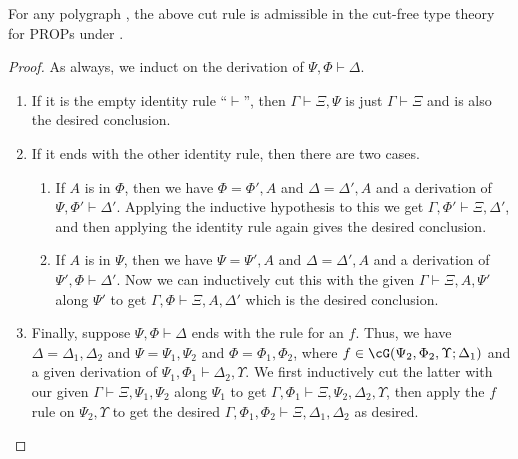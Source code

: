 \documentclass{book}
\let\types\vdash
\begin{document}
\begin{thm}\label{thm:prop-cutadm}
  For any polygraph \cG, the above cut rule is admissible in the cut-free type theory for PROPs under \cG.
\end{thm}
\begin{proof}
  As always, we induct on the derivation of $\Psi,\Phi \types \Delta$.
  \begin{enumerate}
  \item If it is the empty identity rule ``$\types$'', then $\Gamma\types\Xi,\Psi$ is just $\Gamma\types\Xi$ and is also the desired conclusion.
  \item If it ends with the other identity rule, then there are two cases.
    \begin{enumerate}
    \item If $A$ is in $\Phi$, then we have $\Phi=\Phi',A$ and $\Delta=\Delta',A$ and a derivation of $\Psi,\Phi'\types\Delta'$.
      Applying the inductive hypothesis to this we get $\Gamma,\Phi'\types \Xi,\Delta'$, and then applying the identity rule again gives the desired conclusion.
    \item If $A$ is in $\Psi$, then we have $\Psi=\Psi',A$ and $\Delta=\Delta',A$ and a derivation of $\Psi',\Phi\types\Delta'$.
      Now we can inductively cut this with the given $\Gamma\types \Xi,A,\Psi'$ along $\Psi'$ to get $\Gamma,\Phi\types \Xi,A,\Delta'$ which is the desired conclusion.
    \end{enumerate}
  \item Finally, suppose $\Psi,\Phi \types \Delta$ ends with the rule for an $f$.
    Thus, we have $\Delta=\Delta_1,\Delta_2$ and $\Psi=\Psi_1,\Psi_2$ and $\Phi=\Phi_1,\Phi_2$, where $f\in\cG(\Psi_2,\Phi_2,\Upsilon;\Delta_1)$ and a given derivation of $\Psi_1,\Phi_1\types \Delta_2,\Upsilon$.
    We first inductively cut the latter with our given $\Gamma\types \Xi,\Psi_1,\Psi_2$ along $\Psi_1$ to get $\Gamma,\Phi_1\types \Xi,\Psi_2,\Delta_2,\Upsilon$, then apply the $f$ rule on $\Psi_2,\Upsilon$ to get the desired $\Gamma,\Phi_1,\Phi_2\types \Xi,\Delta_1,\Delta_2$ as desired.\qedhere
  \end{enumerate}
\end{proof}
\end{document}
